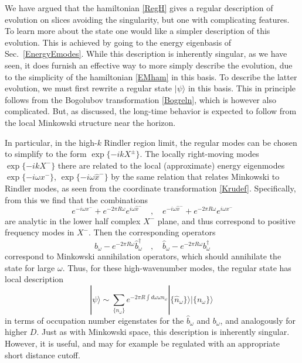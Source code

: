 \documentclass[11pt]{article}
\numberwithin{equation}{section}
\newcommand{\beq}{\begin{equation}}
\newcommand{\eeq}{\end{equation}}
\begin{document}
We have argued that the hamiltonian \eqref{RegH} gives a regular description of evolution on slices avoiding the singularity, but one with complicating features.  
To learn more about the state one would like a simpler description of this evolution.  This is achieved by going to the energy eigenbasis of Sec.~\ref{EnergyEmodes}. While this description is inherently singular, as we have seen, it does furnish an effective way to more simply describe the evolution, due to the simplicity of the hamiltonian  \eqref{EMham} in this basis.  To describe the latter evolution, we must first rewrite a regular state $|\psi\rangle$ in this basis.  This in principle follows from the Bogolubov transformation \eqref{Bogreln}, which is however also complicated.  But, as discussed, the long-time behavior is expected to follow from the local Minkowski structure near the horizon.


In particular, in the high-$k$  Rindler region limit, the regular modes can be chosen to simplify to the form $\exp\{-ikX^\pm\}$.  The locally right-moving modes $\exp\{-ikX^-\}$ there are related to the local (approximate) energy eigenmodes $\exp\{-i\omega x^-\}$, $\exp\{-i\omega \hat x^-\}$ by the same relation that relates Minkowski to Rindler modes, as seen from the coordinate transformation \eqref{Krudef}.  Specifically, from this we find that the combinations
\beq
e^{-i\omega x^-} + e^{-2\pi R\omega} e^{i\omega \hat x^-}\quad ,\quad e^{-i\omega \hat x^-} + e^{-2\pi R\omega} e^{i\omega  x^-}
\eeq
are analytic in the lower half complex $X^-$ plane, and thus correspond to positive frequency modes in $X^-$.  Then the corresponding operators
\beq
b_\omega - e^{-2\pi R\omega}\hat b^\dagger_\omega\quad,\quad \hat b_\omega - e^{-2\pi R\omega} b^\dagger_\omega
\eeq
correspond to Minkowski annihilation operators, which should annihilate the state for large $\omega$.  
Thus, for these high-wavenumber modes, the regular state has local description
\beq\label{statereln}
|\psi\rangle \sim\sum_{\{n_\omega\}} e^{-2\pi R\int d\omega \omega n_\omega }| \{\hat n_\omega\} \rangle |\{n_\omega\}\rangle\ 
\eeq
in terms of occupation number eigenstates for the $\hat b_\omega$ and $b_\omega$, and analogously for higher $D$.
Just as with Minkowski space, this description is inherently singular.  However, it is useful, and may for example be regulated with an appropriate short distance cutoff.
\end{document}
